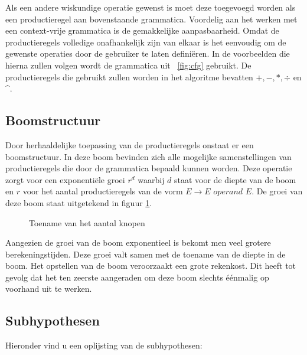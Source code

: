 \documentclass[Main.tex]{subfiles}
\begin{document}
Als een andere wiskundige operatie gewenst is moet deze toegevoegd worden als een productieregel aan bovenstaande grammatica. Voordelig aan het werken met een context-vrije grammatica is de gemakkelijke aanpasbaarheid. Omdat de productieregels volledige onafhankelijk zijn van elkaar is het eenvoudig om de gewenste operaties door de gebruiker te laten defini\"eren. In de voorbeelden die hierna zullen volgen wordt de grammatica uit ~\ref{fig:cfg} gebruikt. De productieregels die gebruikt zullen worden in het algoritme bevatten $+, -, \ast, \div$ en \^{}.

\subsection{Boomstructuur}

Door herhaaldelijke toepassing van de productieregels onstaat er een boomstructuur. In deze boom bevinden zich alle mogelijke samenstellingen van productieregels die door de grammatica bepaald kunnen worden. Deze operatie zorgt voor een exponenti\"ele groei $r^{d}$ waarbij $d$ staat voor de diepte van de boom en $r$ voor het aantal productieregels van de vorm $E \rightarrow E$  $operand$ $ E$. De groei van deze boom staat uitgetekend in figuur \ref{fig:treeSize}.

\begin{figure}[!htb]
\centering
\caption{Toename van het aantal knopen}
\label{fig:treeSize}
\end{figure}



Aangezien de groei van de boom exponentieel is bekomt men veel grotere berekeningstijden. Deze groei valt samen met de toename van de diepte in de boom. Het opstellen van de boom veroorzaakt een grote rekenkost. Dit heeft tot gevolg dat het ten zeerste aangeraden om deze boom slechts \'e\'enmalig op voorhand uit te werken.

\subsection{Subhypothesen} \label{ssec:subhypothesen}
\par Hieronder vind u een oplijsting van de subhypothesen:
\end{document}
